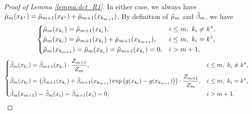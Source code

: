 \documentclass[nohyperref]{article}
\theoremstyle{plain}
\begin{document}
\begin{proof}[Proof of Lemma \ref{lemma:dct_R1}]
In either case, we always have $\Tilde{\mu}_{m} (x_{k^*}) = \Tilde{\mu}_{m+1} (x_{k^*}) + \Tilde{\mu}_{m+1} (x_{k_{m+1}})$.
By definition of $\Tilde{\mu}_m$ and $\Tilde{\beta}_m$, we have
\begin{equation*}
    \left\{
    \begin{aligned}
        &\Tilde{\mu}_m (x_{k_i}) = \Tilde{\mu}_{m+1} (x_{k_i}),& &i \leq m,\ k_i \neq k^*, \\
        &\Tilde{\mu}_m (x_{k_i}) = \Tilde{\mu}_{m+1} (x_{k_i}) + \Tilde{\mu}_{m+1} (x_{k_{m+1}}),& &i \leq m,\ k_i = k^*, \\
        &\Tilde{\mu}_m (x_{k_{m+1}}) = \Tilde{\mu}_m (x_{k_i}) = \Tilde{\mu}_{m+1} (x_{k_i}) = 0,& &i>m+1, \\
    \end{aligned}
    \right.
\end{equation*}
\begin{equation*}
    \left\{
    \begin{aligned}
        &\Tilde{\beta}_m (x_{k_i}) = \Tilde{\beta}_{m+1} (x_{k_i}) \cdot \frac{Z_{m+1}}{Z_m},& &i \leq m,\ k_i \neq k^*, \\
        &\Tilde{\beta}_m (x_{k_i}) = \left( \Tilde{\beta}_{m+1} (x_{k_i})  + \Tilde{\beta}_{m+1} (x_{k_{m+1}}) \exp\left(g(x_{k_i}) - g(x_{k_{m+1}})\right) \right) \cdot \frac{Z_{m+1}}{Z_m},& &i \leq m,\ k_i = k^*, \\
        &\Tilde{\beta}_m (x_{m+1}) = \Tilde{\beta}_m (x_i) = \Tilde{\beta}_{m+1} (x_i) = 0,& &i>m+1. \\
    \end{aligned}
    \right.
\end{equation*}


\end{proof}
\end{document}
